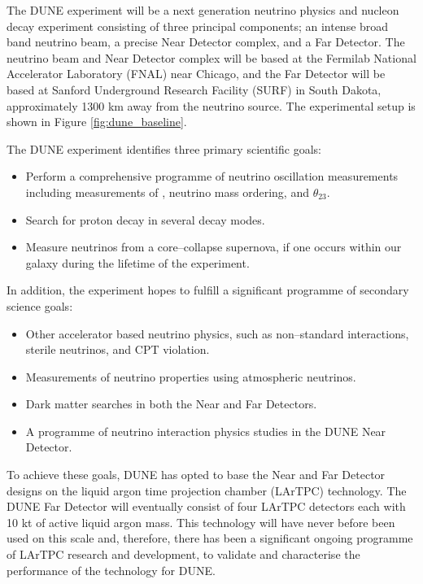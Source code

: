 The DUNE experiment will be a next generation neutrino physics and nucleon decay
experiment consisting of three principal components; an intense broad band 
neutrino beam, a precise Near Detector complex, and a Far Detector. The neutrino
beam and Near Detector complex will be based at the Fermilab National 
Accelerator Laboratory (FNAL) near Chicago, and the Far Detector will be based 
at Sanford Underground Research Facility (SURF) in South Dakota, approximately 
1300 km away from the neutrino source. The experimental setup is shown in Figure
\ref{fig:dune_baseline}. 

The DUNE experiment identifies three primary scientific goals\cite{Abi:2020evt}:
\begin{itemize}
	\item Perform a comprehensive programme of neutrino oscillation measurements
		including measurements of \dcp{}, neutrino mass ordering, and $\theta_{23}$.
	\item Search for proton decay in several decay modes.
	\item Measure neutrinos from a core--collapse supernova, if one occurs within 
		our galaxy during the lifetime of the experiment.
\end{itemize}
In addition, the experiment hopes to fulfill a significant programme of
secondary science goals:
\begin{itemize}
	\item Other accelerator based neutrino physics, such as non--standard
		interactions, sterile neutrinos, and CPT violation.
	\item Measurements of neutrino properties using atmospheric neutrinos.
	\item Dark matter searches in both the Near and Far Detectors.
	\item A programme of neutrino interaction physics studies in the DUNE Near
		Detector.
\end{itemize}

To achieve these goals, DUNE has opted to base the Near and Far Detector designs
on the liquid argon time projection chamber (LArTPC) technology. The DUNE
Far Detector will eventually consist of four LArTPC detectors each with 10 kt 
of active liquid argon mass. This technology will have never before been used 
on this scale and, therefore, there has been a significant ongoing programme 
of LArTPC research and development, to validate and characterise the performance
of the technology for DUNE. 

